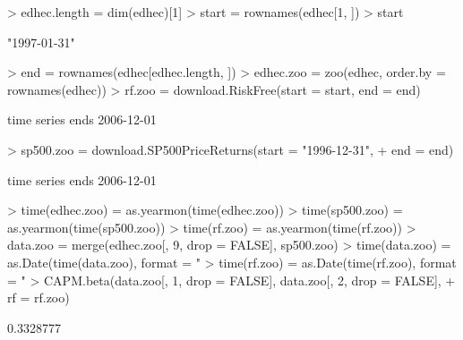 \documentclass[12pt,letterpaper,english]{article}
\begin{document}
\begin{Examples}
\begin{Schunk}
\begin{Sinput}
> edhec.length = dim(edhec)[1]
> start = rownames(edhec[1, ])
> start
\end{Sinput}
\begin{Soutput}
[1] "1997-01-31"
\end{Soutput}
\begin{Sinput}
> end = rownames(edhec[edhec.length, ])
> edhec.zoo = zoo(edhec, order.by = rownames(edhec))
> rf.zoo = download.RiskFree(start = start, end = end)
\end{Sinput}
\begin{Soutput}
time series ends   2006-12-01
\end{Soutput}
\begin{Sinput}
> sp500.zoo = download.SP500PriceReturns(start = "1996-12-31", 
+     end = end)
\end{Sinput}
\begin{Soutput}
time series ends   2006-12-01
\end{Soutput}
\begin{Sinput}
> time(edhec.zoo) = as.yearmon(time(edhec.zoo))
> time(sp500.zoo) = as.yearmon(time(sp500.zoo))
> time(rf.zoo) = as.yearmon(time(rf.zoo))
> data.zoo = merge(edhec.zoo[, 9, drop = FALSE], sp500.zoo)
> time(data.zoo) = as.Date(time(data.zoo), format = "%b %Y")
> time(rf.zoo) = as.Date(time(rf.zoo), format = "%b %Y")
> CAPM.beta(data.zoo[, 1, drop = FALSE], data.zoo[, 2, drop = FALSE], 
+     rf = rf.zoo)
\end{Sinput}
\begin{Soutput}
[1] 0.3328777
\end{Soutput}
\end{Schunk}
\end{Examples}
\end{document}
